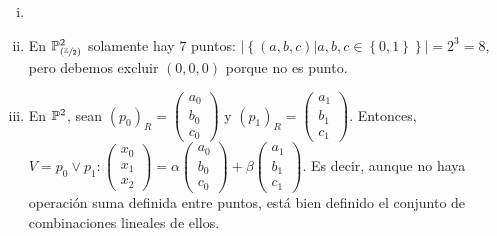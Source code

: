 
\begin{obs}
    \begin{enumerate}[(i)]
        \item []
        \item En $\mathbb{P} ^2 _{\left( \sfrac{\mathbb{Z}}{2} \right)}$ solamente hay $7$ puntos: $\left| \left\{ \left(a, b, c \right) | a, b, c \in \left\{0, 1 \right\} \right\} \right|  = 2^3 = 8$, pero debemos excluir $\left( 0, 0, 0 \right)$ porque no es punto.
        \item En $\mathbb{P} ^2$, sean $\left( p_0 \right)_R = \begin{pmatrix} a_0 \\ b_0 \\ c_0 \end{pmatrix}$ y $\left( p_1 \right)_R = \begin{pmatrix} a_1 \\ b_1 \\ c_1 \end{pmatrix}$. Entonces, $V=p_0 \vee p_1 \colon \begin{pmatrix} x_0 \\ x_1 \\ x_2 \end{pmatrix} = \alpha \begin{pmatrix} a_0 \\ b_0 \\ c_0 \end{pmatrix} + \beta \begin{pmatrix} a_1 \\ b_1 \\ c_1 \end{pmatrix}$. Es decir, aunque no haya operación suma definida entre puntos, está bien definido el conjunto de combinaciones lineales de ellos.
    \end{enumerate}
\end{obs}
